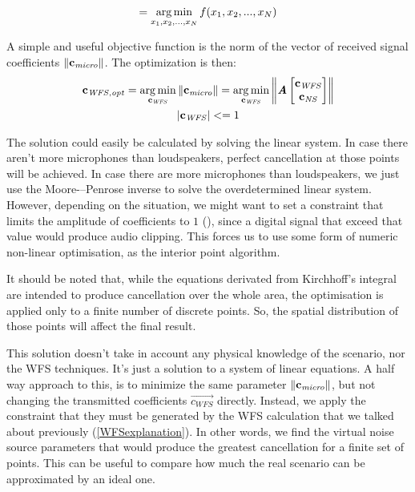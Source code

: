\begin{equation}
[x_{\mathit{opt} (1)}, x_{\mathit{opt} (2)}, ..., x_{\mathit{opt} (N)}] = \argmin_{x_1, x_2, ..., x_N} f(x_1, x_2, ..., x_N)
\label{optimisationGeneral}
\end{equation}

A simple and useful objective function is the norm of the vector of received signal coefficients $\left\| \mathbf{c_\mathit{micro}} \right\|$. The optimization is then:
\begin{gather}
\mathbf{c_{\mathit{WFS}, \mathit{opt}}} =
\operatorname*{arg\,min}_{\mathbf{c_\mathit{WFS}}}
\left\| \mathbf{c_\mathit{micro}} \right\| =
\operatorname*{arg\,min}_{\mathbf{c_\mathit{WFS}}}
\left\| \bm{\mathit{A}}
\begin{bmatrix}
\mathbf{c_\mathit{WFS}}\\
\mathbf{c_\mathit{NS}}\\
\end{bmatrix}
 \right\| \\
\left | \mathbf{c_{\mathit{WFS}}} \right | <= 1
\label{OptConstraint}
\end{gather}

The solution could easily be calculated by solving the linear system. In case there aren't more microphones than loudspeakers, perfect cancellation at those points will be achieved. In case there are more microphones than loudspeakers, we just use the Moore-–Penrose inverse to solve the overdetermined linear system. However, depending on the situation, we might want to set a constraint that limits the amplitude of coefficients to $1$ (), since a digital signal that exceed that value would produce audio clipping. This forces us to use some form of numeric non-linear optimisation, as the interior point algorithm.

It should be noted that, while the equations derivated from Kirchhoff's integral are intended to produce cancellation over the whole area, the optimisation is applied only to a finite number of discrete points. So, the spatial distribution of those points will affect the final result.

This solution doesn't take in account any physical knowledge of the scenario, nor the WFS techniques. It's just a solution to a system of linear equations. A half way approach to this, is to minimize the same parameter $\left\| \mathbf{c_\mathit{micro}} \right\|$, but not changing the transmitted coefficients $\vec{c_{\mathit{WFS}}}$ directly. Instead, we apply the constraint that they must be generated by the WFS calculation that we talked about previously (\autoref{WFSexplanation}). In other words, we find the virtual noise source parameters that would produce the greatest cancellation for a finite set of points. This can be useful to compare how much the real scenario can be approximated by an ideal one.

